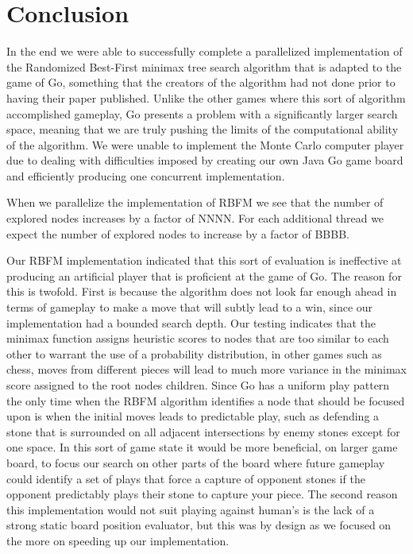 \documentclass[conference]{IEEEtran}
\begin{document}
\section{Conclusion}
In the end we were able to successfully complete a parallelized implementation of the Randomized Best-First minimax tree search algorithm that is adapted to the game of Go, something that the creators of the algorithm had not done prior to having their paper published. Unlike the other games where this sort of algorithm accomplished gameplay, Go presents a problem with a significantly larger search space, meaning that we are truly pushing the limits of the computational ability of the algorithm. We were unable to implement the Monte Carlo computer player due to dealing with difficulties imposed by creating our own Java Go game board and efficiently producing one concurrent implementation.\par
When we parallelize the implementation of RBFM we see that the number of explored nodes increases by a factor of NNNN. For each additional thread we expect the number of explored nodes to increase by a factor of BBBB.\par
Our RBFM implementation indicated that this sort of evaluation is ineffective at producing an artificial player that is proficient at the game of Go. The reason for this is twofold. First is because the algorithm does not look far enough ahead in terms of gameplay to make a move that will subtly lead to a win, since our implementation had a bounded search depth. Our testing indicates that the minimax function assigns heuristic scores to nodes that are too similar to each other to warrant the use of a probability distribution, in other games such as chess, moves from different pieces will lead to much more variance in the minimax score assigned to the root nodes children. Since Go has a uniform play pattern the only time when the RBFM algorithm identifies a node that should be focused upon is when the initial moves leads to predictable play, such as defending a stone that is surrounded on all adjacent intersections by enemy stones except for one space. In this sort of game state it would be more beneficial, on larger game board, to focus our search on other parts of the board where future gameplay could identify a set of plays that force a capture of opponent stones if the opponent predictably plays their stone to capture your piece. The second reason this implementation would not suit playing against human's is the lack of a strong static board position evaluator, but this was by design as we focused on the more on speeding up our implementation.\par
\end{document}

